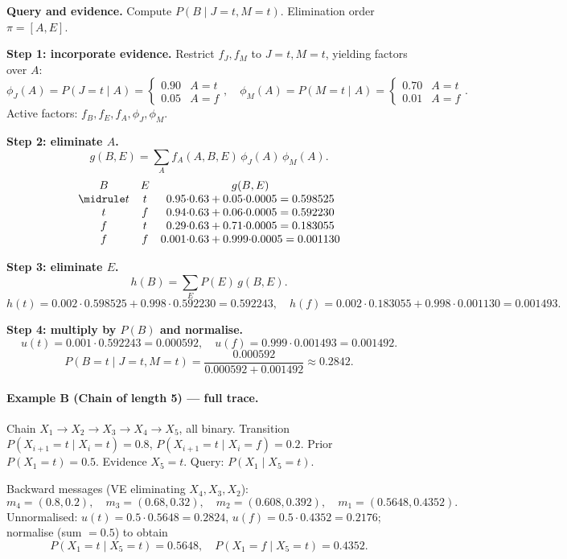 \textbf{Query and evidence.} Compute $P(B\mid J=t,M=t)$.
Elimination order $\pi=[A,E]$.

\textbf{Step 1: incorporate evidence.}
Restrict $f_J,f_M$ to $J=t,M=t$, yielding factors over $A$:
\[
\phi_J(A)=P(J=t\mid A)=\begin{cases}0.90 & A=t\\0.05 & A=f\end{cases},\quad
\phi_M(A)=P(M=t\mid A)=\begin{cases}0.70 & A=t\\0.01 & A=f\end{cases}.
\]
Active factors: $f_B,f_E,f_A,\phi_J,\phi_M$.

\textbf{Step 2: eliminate $A$.}
\[
g(B,E)=\sum_{A} f_A(A,B,E)\,\phi_J(A)\,\phi_M(A).
\]
\[
\begin{array}{ccc}
B & E & g(B,E)\\\midrule
t & t & 0.95{\cdot}0.63+0.05{\cdot}0.0005=0.598525\\
t & f & 0.94{\cdot}0.63+0.06{\cdot}0.0005=0.592230\\
f & t & 0.29{\cdot}0.63+0.71{\cdot}0.0005=0.183055\\
f & f & 0.001{\cdot}0.63+0.999{\cdot}0.0005=0.001130
\end{array}
\]

\textbf{Step 3: eliminate $E$.}
\[
h(B)=\sum_E P(E)\,g(B,E).
\]
\[
h(t)=0.002{\cdot}0.598525+0.998{\cdot}0.592230=0.592243,\quad
h(f)=0.002{\cdot}0.183055+0.998{\cdot}0.001130=0.001493.
\]

\textbf{Step 4: multiply by $P(B)$ and normalise.}
\[
u(t)=0.001{\cdot}0.592243=0.000592,\quad u(f)=0.999{\cdot}0.001493=0.001492.
\]
\[
P(B=t\mid J=t,M=t)=\frac{0.000592}{0.000592+0.001492}\approx\mathbf{0.2842}.
\]

\paragraph{Example B (Chain of length 5) --- full trace.}
Chain $X_1\to X_2\to X_3\to X_4\to X_5$, all binary.
Transition $P(X_{i+1}=t\mid X_i=t)=0.8$, $P(X_{i+1}=t\mid X_i=f)=0.2$.
Prior $P(X_1=t)=0.5$. Evidence $X_5=t$. Query: $P(X_1\mid X_5=t)$.

Backward messages (VE eliminating $X_4,X_3,X_2$):
\[
m_4=(0.8,0.2),\quad m_3=(0.68,0.32),\quad m_2=(0.608,0.392),\quad
m_1=(0.5648,0.4352).
\]
Unnormalised: $u(t)=0.5{\cdot}0.5648=0.2824$, $u(f)=0.5{\cdot}0.4352=0.2176$;
normalise (sum $=0.5$) to obtain
\[
P(X_1=t\mid X_5=t)=\mathbf{0.5648},\quad P(X_1=f\mid X_5=t)=0.4352.
\]

